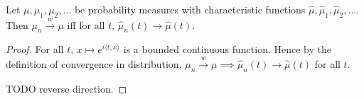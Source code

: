 \begin{theorem}\label{thm:charFun_tendsto_iff_measure_tendsto}
Let $\mu, \mu_1, \mu_2, \ldots$ be probability measures with characteristic functions $\hat{\mu}, \hat{\mu}_1, \hat{\mu}_2, \ldots$. Then $\mu_n \xrightarrow{w} \mu$ iff for all $t$, $\hat{\mu}_n(t) \to \hat{\mu}(t)$.
\end{theorem}

\begin{proof}
For all $t$, $x \mapsto e^{i \langle t, x \rangle}$ is a bounded continuous function. Hence by the definition of convergence in distribution, $\mu_n \xrightarrow{w} \mu \implies \hat{\mu}_n(t) \to \hat{\mu}(t)$ for all $t$.

TODO reverse direction.
\end{proof}